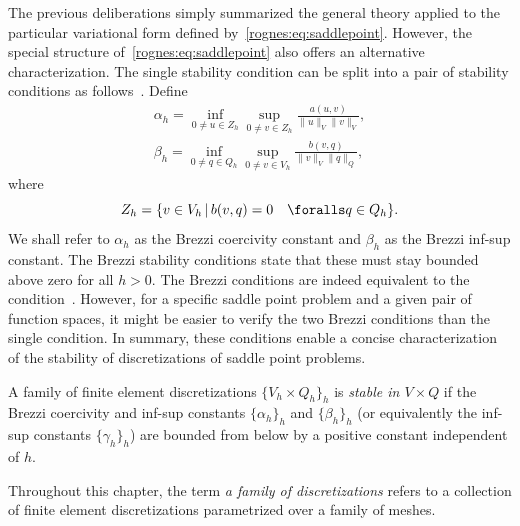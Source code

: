 The previous deliberations simply summarized the general theory
applied to the particular variational form defined
by~\eqref{rognes:eq:saddlepoint}. However, the special structure
of~\eqref{rognes:eq:saddlepoint} also offers an alternative
characterization. The single \babuska{} stability condition can be
split into a pair of stability conditions as
follows~\citep{Brezzi1974}. Define
\begin{align}
  \label{rognes:eq:brezzi:coercivity}
  \alpha_h =
  \inf_{0 \not = u \in Z_h}
  \sup_{0 \not = v \in Z_h}
  \frac{a(u, v)}{\|u\|_{V} \|v\|_{V}} , \\
  \label{rognes:eq:brezzi:infsup}
  \beta_h =
  \inf_{0 \not = q \in Q_h}
  \sup_{0 \not = v \in V_h}
  \frac{b(v, q)}
       {\|v\|_{V} \|q\|_{Q}},
\end{align}
where
\begin{equation}
  Z_h = \{ v \in V_h \, | \, b(v, q) = 0 \quad \foralls q \in Q_h\}.
\end{equation}
We shall refer to $\alpha_h$ as the Brezzi coercivity constant and
$\beta_h$ as the Brezzi inf-sup constant. The Brezzi stability
conditions state that these must stay bounded above zero for all $h >
0$. The Brezzi conditions are indeed equivalent to the \babuska{}
condition~\citep{Brezzi1974}. However, for a specific saddle point
problem and a given pair of function spaces, it might be easier to
verify the two Brezzi conditions than the single \babuska{} condition.
In summary, these conditions enable a concise characterization of the
stability of discretizations of saddle point problems.
\begin{definition}
  \label{rognes:def:stable}
  A family of finite element discretizations $\{V_h \times Q_h\}_h$ is
  \emph{stable in $V \times Q$} if the Brezzi coercivity and inf-sup
  constants $\{ \alpha_h \}_h $ and $\{ \beta_h \}_h$ (or equivalently
  the \babuska{} inf-sup constants $\{ \gamma_h \}_h$) are bounded
  from below by a positive constant independent of $h$.
\end{definition}
Throughout this chapter, the term \emph{a family of discretizations}
refers to a collection of finite element discretizations parametrized
over a family of meshes.

